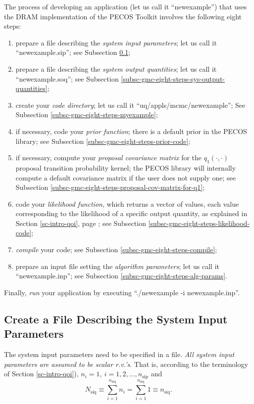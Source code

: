 The process of developing an application (let us call it ``newexample'') 
that uses the DRAM implementation of the PECOS Toolkit involves the following eight steps:
\begin{enumerate}
\item prepare a file describing the {\it system input parameters}; let us call it ``newexample.sip''; see Subsection \ref{subsc-gmc-eight-steps-sys-input-params};
\item prepare a file describing the {\it system output quantities}; let us call it ``newexample.soq''; see Subsection \ref{subsc-gmc-eight-steps-sys-output-quantities};
\item create your {\it code directory}; let us call it ``uq/appls/mcmc/newexample''; See Subsection \ref{subsc-gmc-eight-steps-myexample};
\item if necessary, code your {\it prior function}; there is a default prior in the PECOS library; see Subsection \ref{subsc-gmc-eight-steps-prior-code};
\item if necessary, compute your {\it proposal covariance matrix} for the $q_1(\cdot,\cdot)$ proposal transition probability kernel; the PECOS library will internally compute a default covariance matrix if the user does not supply one; see Subsection \ref{subsc-gmc-eight-steps-proposal-cov-matrix-for-q1};
\item code your {\it likelihood function}, which returns a vector of values, each value corresponding to the likelihood of a specific output quantity, as explained in Section \ref{sc-intro-qoi}, page \pageref{sc-intro-qoi}; see Subsection \ref{subsc-gmc-eight-steps-likelihood-code};
\item {\it compile} your code; see Subsection \ref{subsc-gmc-eight-steps-compile};
\item prepare an input file setting the {\it algorithm parameters}; let us call it ``newexample.inp''; see Subsection \ref{subsc-gmc-eight-steps-alg-params}.
\end{enumerate}
Finally, {\it run} your application by executing ``./newexample -i newexample.inp''.

\subsection{Create a File Describing the System Input Parameters}\label{subsc-gmc-eight-steps-sys-input-params}

The system input parameters need to be specified in a file.
{\it All system input parameters are assumed to be scalar r.v.'s}. That is, according to the terminology of Section \ref{sc-intro-qoi}), $n_i=1,~i=1,2,\ldots,n_{\text{sip}}$ and
\begin{equation*}
N_{\text{siq}} \equiv \sum_{i=1}^{n_{\text{siq}}}n_i = \sum_{i=1}^{n_{\text{siq}}}1 \equiv n_{\text{siq}}.
\end{equation*}

